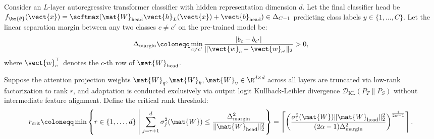 \begin{theorem}
\label{thm:subspace_collapse}
Consider an $L$-layer autoregressive transformer classifier with hidden representation dimension $d$. Let the final classifier head be $f_{\bm{\theta}}(\vect{x}) = \softmax(\mat{W}_{\text{head}} \vect{h}_L(\vect{x}) + \vect{b}_{\text{head}}) \in \Delta_{C-1}$ predicting class labels $y \in \{1, \dots, C\}$.
Let the linear separation margin between any two classes $c \ne c'$ on the pre-trained model be:
\begin{equation}
\Delta_{\text{margin}} \coloneqq \min_{c \ne c'} \frac{|b_c - b_{c'}|}{\|\vect{w}_c - \vect{w}_{c'}\|_2} > 0,
\label{app:eq:margin_def}
\end{equation}
where $\vect{w}_c^\top$ denotes the $c$-th row of $\mat{W}_{\text{head}}$.

Suppose the attention projection weights $\mat{W}_q, \mat{W}_k, \mat{W}_v \in \R^{d \times d}$ across all layers are truncated via low-rank factorization to rank $r$, and adaptation is conducted exclusively via output logit Kullback-Leibler divergence $\mathcal{D}_{\text{KL}}(P_T \| P_S)$ without intermediate feature alignment.
Define the critical rank threshold:
\begin{equation}
r_{\text{crit}} \coloneqq \min \left\{ r \in \{1, \dots, d\} \;\middle|\; \sum_{j=r+1}^d \sigma_j^2(\mat{W}) \le \frac{\Delta_{\text{margin}}^2}{\|\mat{W}_{\text{head}}\|_2^2} \right\} = \left\lceil \left( \frac{\sigma_1^2(\mat{W}) \|\mat{W}_{\text{head}}\|_2^2}{(2\alpha - 1) \Delta_{\text{margin}}^2} \right)^{\frac{1}{2\alpha - 1}} \right\rceil.
\label{eq:critical_rank_def}
\end{equation}


\end{theorem}
